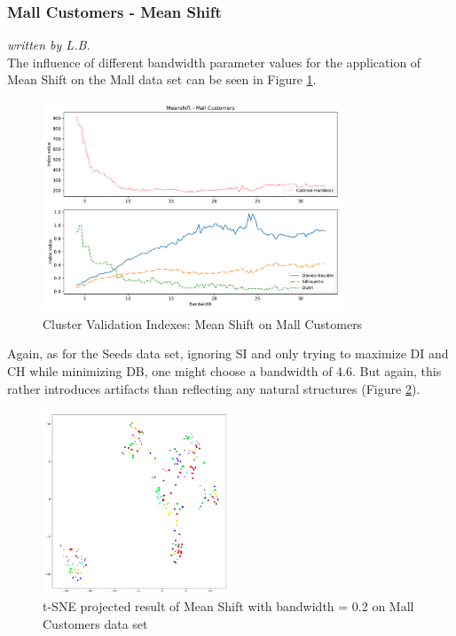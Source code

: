 
\subsubsection{Mall Customers - Mean Shift}
\textit{written by L.B.}\\

The influence of different bandwidth parameter values for the application of Mean Shift on the Mall data set can be seen in Figure \ref{fig:meanshift_mall}.

\begin{figure}[H]
\begin{center}
\includegraphics[width=0.8\textwidth]{images/Meanshift_-_Mall_Customers.pdf}
\end{center}
\caption{Cluster Validation Indexes: Mean Shift on Mall Customers}
\label{fig:meanshift_mall}
\end{figure}
Again, as for the Seeds data set, ignoring \gls{SI} and only trying to maximize \gls{DI} and \gls{CH} while minimizing \gls{DB}, one might choose a bandwidth of 4.6. But again, this rather introduces artifacts than reflecting any natural structures (Figure \ref{fig:meanshift_mall_4_6}).

\begin{figure}[H]
\begin{center}
\includegraphics[width=0.5\textwidth]{images/Meanshift_Mall_4_6.png}
\end{center}
\caption{t-SNE projected result of Mean Shift with bandwidth = 0.2 on Mall Customers data set}
\label{fig:meanshift_mall_4_6}
\end{figure}


